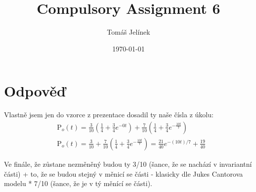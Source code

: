 \documentclass{article}
\title{Compulsory Assignment 6}
\author{Tomáš Jelínek}
\date{\today}
\begin{document}
\maketitle
\section*{Odpověď}

Vlastně jsem jen do vzorce z prezentace dosadil ty naše čísla z úkolu:
\[
\begin{aligned}
&\text{P}_o(t) = \frac{3}{10} \left( \frac{1}{4} + \frac{3}{4} e^{-0t} \right) + \frac{7}{10} \left( \frac{1}{4} + \frac{3}{4} e^{-\frac{10t}{7}} \right) \\
&\text{P}_o(t) = \frac{3}{10} + \frac{7}{10} \left( \frac{1}{4} + \frac{3}{4} e^{-\frac{10t}{7}} \right) = \frac{21}{40} e^{-(10t)/7} + \frac{19}{40}
\end{aligned}
\]

Ve finále, že zůstane nezměněný budou ty 3/10 (šance, že se nachází v invariantní části) + to, že se budou stejný v měnicí se části - klasicky dle Jukes Cantorova modelu * 7/10 (šance, že je v tý měnící se části).
\end{document}
